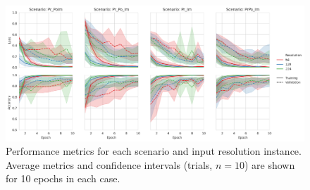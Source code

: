 \documentclass[Journal,letterpaper, SingleSpace, InsideFigs]{ascelike-new}
\begin{document}
\begin{figure}[ht]
    \centering
    \includegraphics[width=1.05\textwidth]{scenario_resolution_performance.png}
    \caption{Performance metrics for each scenario and input resolution instance. Average metrics and confidence intervals (trials, $n=10$) are shown for 10 epochs in each case.}
    \label{fig:sens-overall}
\end{figure}
\end{document}
